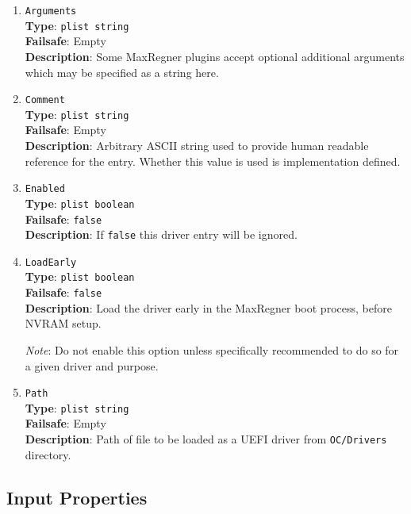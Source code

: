 \documentclass[]{article}
\makeatletter
\renewcommand{\label}[1]{%
\zref@wrapper@immediate{\oldlabel{#1}}}  %
\makeatother
\begin{document}
\begin{enumerate}

\item
  \texttt{Arguments}\\
  \textbf{Type}: \texttt{plist\ string}\\
  \textbf{Failsafe}: Empty\\
  \textbf{Description}: Some MaxRegner plugins accept optional additional arguments
  which may be specified as a string here.

\item
  \texttt{Comment}\\
  \textbf{Type}: \texttt{plist\ string}\\
  \textbf{Failsafe}: Empty\\
  \textbf{Description}: Arbitrary ASCII string used to provide human readable
  reference for the entry. Whether this value is used is implementation defined.

\item
  \texttt{Enabled}\\
  \textbf{Type}: \texttt{plist\ boolean}\\
  \textbf{Failsafe}: \texttt{false}\\
  \textbf{Description}: If \texttt{false} this driver entry will be ignored.

\item
  \texttt{LoadEarly}\\
  \textbf{Type}: \texttt{plist\ boolean}\\
  \textbf{Failsafe}: \texttt{false}\\
  \textbf{Description}: Load the driver early in the MaxRegner boot process, before NVRAM setup.

  \emph{Note}: Do not enable this option unless specifically recommended to do so for a
  given driver and purpose.

\item
  \texttt{Path}\\
  \textbf{Type}: \texttt{plist\ string}\\
  \textbf{Failsafe}: Empty\\
  \textbf{Description}: Path of file to be loaded as a UEFI driver
  from \texttt{OC/Drivers} directory.

\end{enumerate}


\subsection{Input Properties}\label{uefiinputprops}
\end{document}
